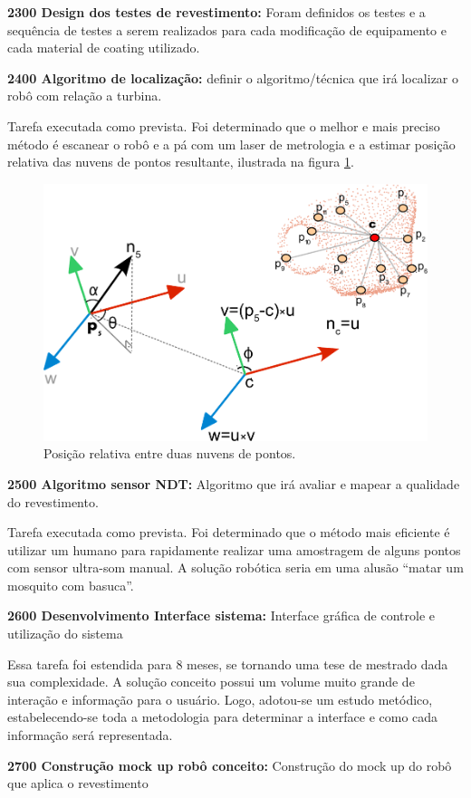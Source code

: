 \noindent
\textbf{2300 Design dos testes de revestimento:} Foram definidos os testes e a
sequência de testes a serem realizados para cada modificação de equipamento e
cada material de coating utilizado.

\noindent
\textbf{2400 Algoritmo de localização:} definir o algoritmo/técnica que irá
localizar o robô com relação a turbina.

Tarefa executada como prevista. Foi determinado que o melhor e mais preciso
método é escanear o robô e a pá com um laser de metrologia e a estimar posição
relativa das nuvens de pontos resultante, ilustrada na figura
\ref{fig::pos_rel}.

\begin{figure}[H]
\centering
\label{fig::pos_rel}
\includegraphics[width=0.6\columnwidth]{figs/pc_position}
\caption{Posição relativa entre duas nuvens de pontos.}
\end{figure} 

\noindent
\textbf{2500 Algoritmo sensor NDT:} Algoritmo que irá avaliar e mapear a
qualidade do revestimento.

Tarefa executada como prevista. Foi determinado que o método mais eficiente é
utilizar um humano para rapidamente realizar uma amostragem de alguns pontos com
sensor ultra-som manual. A solução robótica seria em uma alusão “matar um mosquito com basuca”.

\noindent
\textbf{2600 Desenvolvimento Interface sistema:} Interface gráfica de controle e
utilização do sistema

Essa tarefa foi estendida para 8 meses, se tornando uma tese de mestrado dada
sua complexidade. A solução conceito possui um volume muito grande de interação
e informação para o usuário. Logo, adotou-se um estudo metódico,
estabelecendo-se toda a metodologia para determinar a interface e como cada
informação será representada.

\noindent
\textbf{2700 Construção mock up robô conceito:} Construção do mock up do robô
que aplica o revestimento

